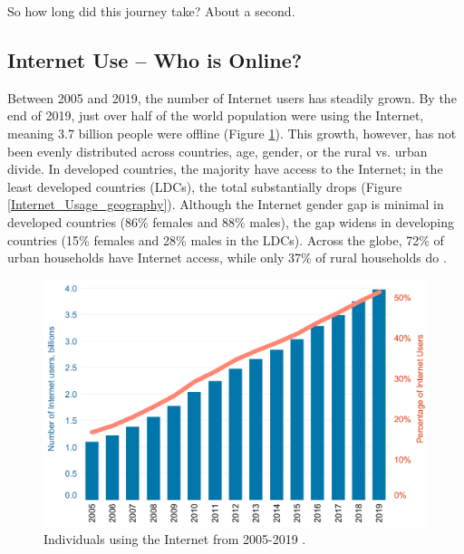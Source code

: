 \documentclass{article}
\begin{document}
So how long did this journey take? About a second.


\subsection{Internet Use -- Who is Online?}
Between 2005 and 2019, the number of Internet users has steadily grown. By the end of 2019, just over half of the world population were using the Internet, meaning 3.7 billion people were offline (Figure \ref{Internet_Usage}). This growth, however, has not been evenly distributed across countries, age, gender, or the rural vs. urban divide. In developed countries, the majority have access to the Internet; in the least developed countries (LDCs), the total substantially drops (Figure \ref{Internet_Usage_geography}). Although the Internet gender gap is minimal in developed countries (86\% females and 88\% males), the gap widens in developing countries (15\% females and 28\% males in the LDCs). Across the globe, 72\% of urban households have Internet access, while only 37\% of rural households do \cite{ITU2019statistics}.

\begin{figure}[h]
    \includegraphics[width=.69 \textwidth]{./images/individuals_internet_2005-2019.png}
    \centering
    \caption{Individuals using the Internet from 2005-2019 \cite{ITU2019statistics}.}
    \label{Internet_Usage}
\end{figure}
\end{document}
